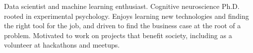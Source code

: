 
\begin{cvparagraph}

Data scientist and machine learning enthusiast. Cognitive neuroscience Ph.D. rooted in experimental psychology. Enjoys learning new technologies and finding the right tool for the job, and driven to find the business case at the root of a problem. Motivated to work on projects that benefit society, including as a volunteer at hackathons and meetups.

\end{cvparagraph}
